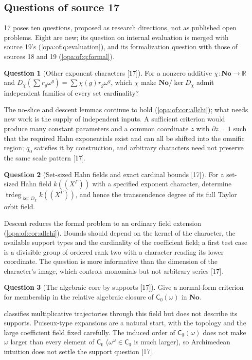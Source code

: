 \documentclass[11pt,oneside]{article}
\numberwithin{equation}{section}
\theoremstyle{definition}
\newtheorem{question}[question]{Question}
\theoremstyle{remark}
\newcommand{\No}{\mathbf{No}}
\newcommand{\R}{\mathbb R}
\newcommand{\trdeg}{\operatorname{trdeg}}
\newcommand{\src}[1]{\textup{\textsf{\small[#1]}}}
\begin{document}
\subsection{Questions of source 17}\label{opa:of:sub:questions}

17 poses ten questions, proposed as research directions, not as published open problems. Eight are new; its question on internal
evaluation is merged with source 19's (\cref{opa:of:q:evaluation}), and its formalization question with those of sources 18 and 19
(\cref{opa:of:q:formal}).

\begin{question}[Other exponent characters \src{17}]\label{opa:of:q:characters}
For a nonzero additive $\chi:\No\to\R$ and $D_\chi(\sum r_g\omega^g)=\sum\chi(g)r_g\omega^g$, which $\chi$ make $\No/\ker D_\chi$ admit
independent families of every set cardinality?
\end{question}
The no-slice and descent lemmas continue to hold (\cref{opa:of:cor:allchi}); what needs new work is the supply of independent
inputs. A sufficient criterion would produce many constant parameters and a common coordinate $z$ with $\partial z=1$ such that the
required Hahn exponentials exist and can all be shifted into the omnific region; $q_0$ satisfies it by construction, and arbitrary
characters need not preserve the same scale pattern \src{17}.

\begin{question}[Set-sized Hahn fields and exact cardinal bounds \src{17}]\label{opa:of:q:setsized}
For a set-sized Hahn field $k((X^\Gamma))$ with a specified exponent character, determine $\trdeg_{\ker D_\chi}k((X^\Gamma))$, and hence
the transcendence degree of its full Taylor orbit field.
\end{question}
Descent reduces the formal problem to an ordinary field extension (\cref{opa:of:cor:allchi}). Bounds should depend on the kernel
of the character, the available support types and the cardinality of the coefficient field; a first test case is a divisible
group of ordered rank two with a character reading its lower coordinate. The question is more informative than the dimension of
the character's image, which controls monomials but not arbitrary series \src{17}.

\begin{question}[The algebraic core by supports \src{17}]\label{opa:of:q:core}
Give a normal-form criterion for membership in the relative algebraic closure of $\mathsf C_0(\omega)$ in $\No$.
\end{question}
 classifies multiplicative trajectories through this field but does not describe its supports.
Puiseux-type expansions are a natural start, with the topology and the large coefficient field fixed carefully. The induced
order of $\mathsf C_0(\omega)$ does not make $\omega$ larger than every element of $\mathsf C_0$ ($\omega^\omega\in\mathsf C_0$ is much larger),
so Archimedean intuition does not settle the support question \src{17}.
\end{document}
